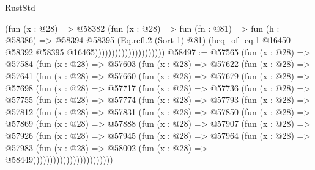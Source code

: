 \begin{lexlean}{RustStd}
\begin{coremodule}
{\begin{coremodule}
{{{{{{{{{{{{{{{{{{{{{{{{{{{{{{{{{{{{{{{{{{{{{{{{{{{{{{{                                        (fun (x : @28) =>
                                        @58382
                                          (fun (x : @28) =>
                                          fun (fn : @81) =>
                                          fun (h : @58386) =>
                                          @58394
                                            @58395
                                            (Eq.refl.{2} (Sort 1) @81)
                                            (heq_of_eq.{1}
                                              @16450
                                              @58392
                                              @58395
                                              @16465)))))))))))))))))))))
@58497 := @57565
    (fun (x : @28) =>
    @57584
      (fun (x : @28) =>
      @57603
        (fun (x : @28) =>
        @57622
          (fun (x : @28) =>
          @57641
            (fun (x : @28) =>
            @57660
              (fun (x : @28) =>
              @57679
                (fun (x : @28) =>
                @57698
                  (fun (x : @28) =>
                  @57717
                    (fun (x : @28) =>
                    @57736
                      (fun (x : @28) =>
                      @57755
                        (fun (x : @28) =>
                        @57774
                          (fun (x : @28) =>
                          @57793
                            (fun (x : @28) =>
                            @57812
                              (fun (x : @28) =>
                              @57831
                                (fun (x : @28) =>
                                @57850
                                  (fun (x : @28) =>
                                  @57869
                                    (fun (x : @28) =>
                                    @57888
                                      (fun (x : @28) =>
                                      @57907
                                        (fun (x : @28) =>
                                        @57926
                                          (fun (x : @28) =>
                                          @57945
                                            (fun (x : @28) =>
                                            @57964
                                              (fun (x : @28) =>
                                              @57983
                                                (fun (x : @28) =>
                                                @58002
                                                  (fun (x : @28) => @58449))))))))))))))))))))))))
}}}}}}}}}}}}}}}}}}}}}}}}}}}}}}}}}}}}}}}}}}}}}}}}}}}}}}}
\end{coremodule}}
\end{coremodule}
\end{lexlean}
